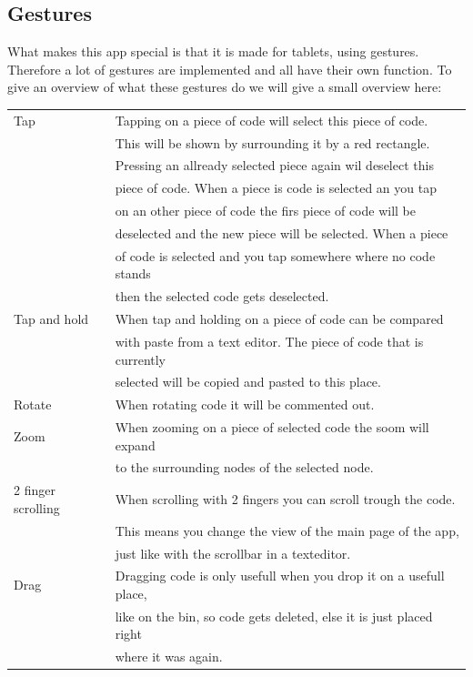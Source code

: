 \documentclass[a4paper,12pt]{report}
\begin{document}
\subsection{Gestures}
What makes this app special is that it is made for tablets, using gestures. Therefore a lot of gestures are implemented and all have their own function. To give an overview of what these gestures do we will give 
a small overview here:

\begin{tabular}{ l | l}
Tap & Tapping on a piece of code will select this piece of code. \\
& This will be shown by surrounding it by a red rectangle.\\
& Pressing an allready selected piece again wil deselect this \\
& piece of code. When a piece is code is selected an you tap \\
& on an other piece of code the firs piece of code will be \\
& deselected and the new piece will be selected. When a piece \\
& of code is selected and you tap somewhere where no code stands \\
& then the selected code gets deselected. \\
Tap and hold & When tap and holding on a piece of code can be compared \\
& with paste from a text editor. The piece of code that is currently \\
& selected will be copied and pasted to this place.\\
Rotate & When rotating code it will be commented out. \\
Zoom & When zooming on a piece of selected code the soom will expand \\
& to the surrounding nodes of the selected node. \\
2 finger scrolling & When scrolling with 2 fingers you can scroll trough the code. \\
& This means you change the view of the main page of the app, \\
& just like with the scrollbar in a texteditor.\\
Drag & Dragging code is only usefull when you drop it on a usefull place,\\
& like on the bin, so code gets deleted, else it is just placed right \\
& where it was again.\\
 \end{tabular}
\end{document}
